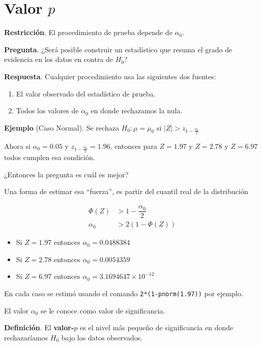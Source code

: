 \documentclass[
  12pt,
]{book}
\providecommand{\tightlist}{%
  \setlength{\itemsep}{0pt}\setlength{\parskip}{0pt}}
\begin{document}
\hypertarget{valor-p}{%
\section{\texorpdfstring{Valor \(p\)}{Valor p}}\label{valor-p}}

\textbf{Restricción}. El procedimiento de prueba depende de \(\alpha_0\).

\textbf{Pregunta}. ¿Será posible construir un estadístico que resuma el grado de
evidencia en los datos en contra de \(H_0\)?

\textbf{Respuesta}. Cualquier procedimiento usa las siguientes dos fuentes:

\begin{enumerate}
\def\labelenumi{\arabic{enumi}.}
\item
  El valor observado del estadístico de prueba.
\item
  Todos los valores de \(\alpha_0\) en donde rechazamos la nula.
\end{enumerate}

\textbf{Ejemplo} (Caso Normal). Se rechaza \(H_0: \mu = \mu_0\) si \(|Z|>z_{1-\frac{\alpha_0}2}\)

Ahora si \(\alpha_0 = 0.05\) y \(z_{1-\frac{\alpha_0}2} = 1.96\), entonces para
\(Z = 1.97\) y \(Z = 2.78\) y \(Z = 6.97\) todos cumplen esa condición.

¿Entonces la pregunta es cuál es mejor?

Una forma de estimar esa ``fuerza'', es partir del cuantil real de la distribución

\begin{align*}
\Phi(Z) &> 1-\dfrac{\alpha_0}2 \\
\alpha_0 &> 2(1-\Phi(Z)) 
\end{align*}

\begin{itemize}
\tightlist
\item
  Si \(Z=1.97\) entonces \(\alpha _{0} =0.0488384\)
\item
  Si \(Z=2.78\) entonces \(\alpha _{0} =0.0054359\)
\item
  Si \(Z=6.97\) entonces \(\alpha _{0} =\ensuremath{3.1694647\times 10^{-12}}\)
\end{itemize}

En cada caso se estimó usando el comando \texttt{2*(1-pnorm(1.97))} por ejemplo.

El valor \(\alpha_0\) se le conoce como valor de significancia.

\textbf{Definición}. El \textbf{valor-\(p\)} es el nivel más pequeño de significancia en
donde rechazaríamos \(H_0\) bajo los datos observados.
\end{document}
